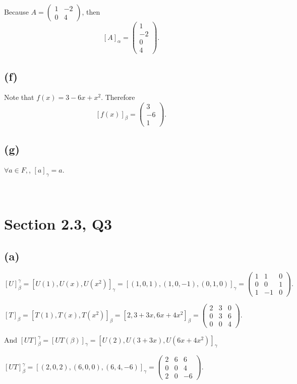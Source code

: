 \documentclass[12pt]{article}%
\begin{document}
Because $A=\begin{pmatrix}1&-2\\0&4\end{pmatrix}$, then $$[A]_\alpha=\begin{pmatrix}1\\-2\\0\\4\end{pmatrix}.$$

\subsection{(f)}

Note that $f(x)=3-6x+x^2.$ Therefore $$[f(x)]_\beta=\begin{pmatrix}3\\-6\\1\end{pmatrix}.$$

\subsection{(g)}

$\forall a\in F,$, $[a]_\gamma=a.$

~\ 

\section{Section 2.3, Q3}

\subsection{(a)}

$[U]_\beta^{\gamma}=[U(1),U(x),U(x^2)]_\gamma=[(1,0,1),(1,0,-1),(0,1,0)]_\gamma=\begin{pmatrix}1&1&0\\0&0&1\\1&-1&0\end{pmatrix}.$

$[T]_\beta=[T(1),T(x),T(x^2)]_\beta=[2,3+3x,6x+4x^2]_\beta=\begin{pmatrix}2&3&0\\0&3&6\\0&0&4\end{pmatrix}.$

And $[UT]_\beta^{\gamma}=[UT(\beta)]_\gamma=[U(2),U(3+3x),U(6x+4x^2)]_\gamma$ 

$[UT]_\beta^{\gamma}=[(2,0,2),(6,0,0),(6,4,-6)]_\gamma=\begin{pmatrix}2&6&6\\0&0&4\\2&0&-6\end{pmatrix}.$
\end{document}
